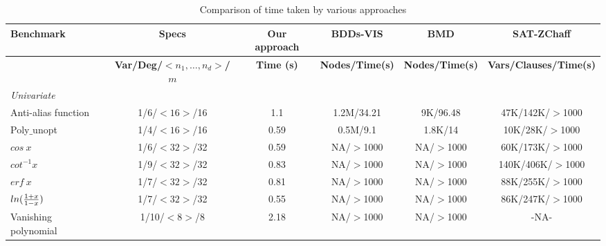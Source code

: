 \begin{table*}[htb]
\begin{center}
\begin{footnotesize}
\caption{Comparison of time taken by various approaches}
\label{tab:res}
\begin{tabular}{||l|c||c|c|c|c||} \hline
{\bf Benchmark}       &{\bf Specs}                       &{\bf Our approach}&{\bf BDDs-VIS}      &{\bf BMD}    &{\bf SAT-ZChaff}  \\\hline
                      &{\bf Var/Deg/$<n_1, \ldots, n_d>$/$m$}&{\bf Time (s)}&{\bf Nodes/Time(s)} &{\bf Nodes/Time(s)} &{\bf Vars/Clauses/Time(s)}  \\ \hline \hline

{\it Univariate}        &  & & & & \\ \hline
Anti-alias function     & 1/6/$<16>$/16  & 1.1   & 1.2M/34.21  & 9K/96.48     & 47K/142K/$>$1000 \\ \hline
Poly$\_$unopt           & 1/4/$<16>$/16  & 0.59  & 0.5M/9.1   & 1.8K/14      & 10K/28K/$>$1000 \\ \hline 
$cos ~x$                & 1/6/$<32>$/32  & 0.59  & NA/$>$1000 & NA/$>$1000   & 60K/173K/$>$1000  \\ \hline
$cot^{-1}x$             & 1/9/$<32>$/32  & 0.83  & NA/$>$1000 & NA/$>$1000   & 140K/406K/$>$1000  \\ \hline
$erf ~x$                & 1/7/$<32>$/32  & 0.81  & NA/$>$1000 & NA/$>$1000   & 88K/255K/$>$1000 \\ \hline
$ln({{1+x}\over{1-x}})$ & 1/7/$<32>$/32  & 0.55  & NA/$>$1000 & NA/$>$1000   & 86K/247K/$>$1000 \\ \hline
Vanishing polynomial    & 1/10/$<8>$/8   & 2.18  & NA/$>$1000 & NA/$>$1000   & -NA- \\ \hline \hline



\end{tabular}
\end{footnotesize}
\end{center}
\end{table*}

